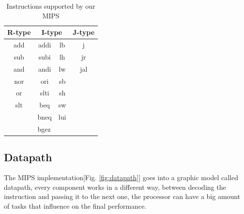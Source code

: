 \documentclass[conference]{IEEEtran}
\begin{document}
    \begin{table}[htbp]
    \caption{Instructions supported by our MIPS}
    \begin{center}
    \begin{tabular}{cc|c|c}
    \hline
    \multicolumn{1}{|c|}{R-type} & \multicolumn{2}{c|}{I-type} & \multicolumn{1}{c|}{J-type} \\ \hline
    \multicolumn{1}{|c|}{add} & addi & \multicolumn{1}{c|}{lb} & \multicolumn{1}{c|}{j} \\ \hline
    \multicolumn{1}{|c|}{sub} & subi & \multicolumn{1}{c|}{lh} & \multicolumn{1}{c|}{jr} \\ \hline
    \multicolumn{1}{|c|}{and} & andi & \multicolumn{1}{c|}{lw} & \multicolumn{1}{c|}{jal} \\ \hline
    \multicolumn{1}{|c|}{nor} & ori & \multicolumn{1}{c|}{sb} &  \\ \cline{1-3}
    \multicolumn{1}{|c|}{or} & slti & \multicolumn{1}{c|}{sh} &  \\ \cline{1-3}
    \multicolumn{1}{|c|}{slt} & beq & \multicolumn{1}{c|}{sw} &  \\ \cline{1-3}
    \multicolumn{1}{|c|}{} & bneq & \multicolumn{1}{c|}{lui} &  \\ \cline{1-3}
    \multicolumn{1}{l|}{} & \multicolumn{1}{l|}{bgez} & \multicolumn{1}{l}{} & \multicolumn{1}{l}{} \\ \cline{2-2}
    \end{tabular}
    \label{tab4}
    \end{center}
    \end{table}
    
\subsection{Datapath}
The MIPS implementation[Fig. \ref{fig:datapath}] goes into a graphic model called datapath, every component works in a different way, between decoding the instruction and passing it to the next one, the processor can have a big amount of tasks that influence on the final performance.
\end{document}
